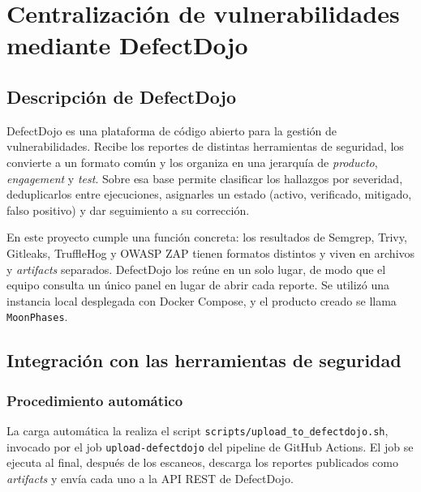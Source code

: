 
\chapter{Centralización de vulnerabilidades mediante DefectDojo}

\section{Descripción de DefectDojo}

DefectDojo es una plataforma de código abierto para la gestión de
vulnerabilidades. Recibe los reportes de distintas herramientas de seguridad,
los convierte a un formato común y los organiza en una jerarquía de
\textit{producto}, \textit{engagement} y \textit{test}. Sobre esa base permite
clasificar los hallazgos por severidad, deduplicarlos entre ejecuciones,
asignarles un estado (activo, verificado, mitigado, falso positivo) y dar
seguimiento a su corrección.

En este proyecto cumple una función concreta: los resultados de Semgrep,
Trivy, Gitleaks, TruffleHog y OWASP ZAP tienen formatos distintos y viven en
archivos y \textit{artifacts} separados. DefectDojo los reúne en un solo
lugar, de modo que el equipo consulta un único panel en lugar de abrir cada
reporte. Se utilizó una instancia local desplegada con Docker Compose, y el
producto creado se llama \texttt{MoonPhases}.

\section{Integración con las herramientas de seguridad}

\subsection{Procedimiento automático}

La carga automática la realiza el script
\texttt{scripts/upload\_to\_defectdojo.sh}, invocado por el job
\texttt{upload-defectdojo} del pipeline de GitHub Actions. El job se ejecuta
al final, después de los escaneos, descarga los reportes publicados como
\textit{artifacts} y envía cada uno a la API REST de DefectDojo.

